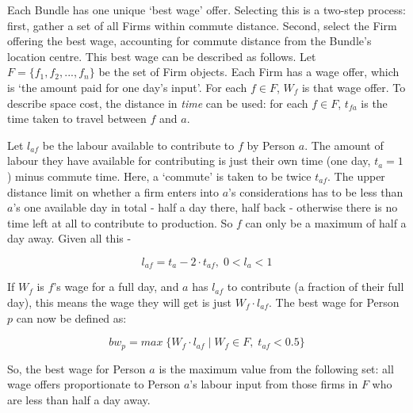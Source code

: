 
Each Bundle has one unique `best wage' offer. Selecting this is a two-step process: first, gather a set of all Firms within commute distance. Second, select the Firm offering the best wage, accounting for commute distance from the Bundle's location centre. This best wage can be described as follows. Let $F=\{f_{1},f_{2},...,f_{n}\}$ be the set of Firm objects. Each Firm has a wage offer, which is `the amount paid for one day's input'. For each $f\in F$, $W_{f}$ is that wage offer. To describe space cost, the distance in \emph{time} can be used: for each $f\in F$, $t_{fa}$ is the time taken to travel between $f$ and $a$. 

Let $l_{af}$ be the labour available to contribute to $f$ by Person $a$. The amount of labour they have available for contributing is just their own time (one day, $t_{a}=1$) minus commute time. Here, a `commute' is taken to be twice $t_{af}$. The upper distance limit on whether a firm enters into $a$'s considerations has to be less than $a$'s one available day in total - half a day there, half back - otherwise there is no time left at all to contribute to production. So $f$ can only be a maximum of half a day away. Given all this -

\[
l_{af}=t_{a}-2\cdot t_{af},\; 0<l_{a}<1\]

If $W_f$ is $f$'s wage for a full day, and $a$ has $l_{af}$ to contribute (a fraction of their full day), this means the wage they will get is just $W_{f}\cdot l_{af}$. The best wage for Person $p$ can now be defined as:

\begin{equation}
bw_p=max\; \{W_{f}\cdot l_{af}\mid W_{f}\in F,\; t_{af}<0.5\}\label{eq:bwpmax}
\end{equation}

So, the best wage for Person $a$ is the maximum value from the following set: all wage offers proportionate to Person $a$'s labour input from those firms in $F$ who are less than half a day away.

